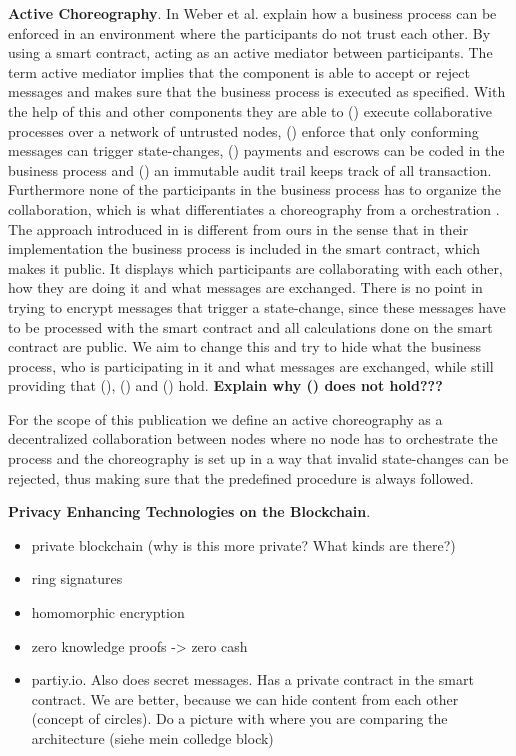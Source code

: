 \documentclass[runningheads]{llncs}
\newcommand{\rom}[1]{(\uppercase\expandafter{\romannumeral #1\relax})}  %
\begin{document}
\bigbreak
\textbf{Active Choreography}. In \cite{weber2016untrusted} Weber et al. explain how a business process can be enforced in an environment where the participants do not trust each other. By using a smart contract, acting as an active mediator between participants. The term active mediator implies that the component is able to accept or reject messages and makes sure that the business process is executed as specified. With the help of this and other components they are able to \rom{1} execute collaborative processes over a network of untrusted nodes, \rom{2} enforce that only conforming messages can trigger state-changes, \rom{3} payments and escrows can be coded in the business process and \rom{4} an immutable audit trail keeps track of all transaction. Furthermore none of the participants in the business process has to organize the collaboration, which is what differentiates a choreography from a orchestration \cite{some_source}. The approach introduced in \cite{weber2016untrusted} is different from ours in the sense that in their implementation the business process is included in the smart contract, which makes it public. It displays which participants are collaborating with each other, how they are doing it and what messages are exchanged. There is no point in trying to encrypt messages that trigger a state-change, since these messages have to be processed with the smart contract and all calculations done on the smart contract are public. We aim to change this and try to hide what the business process, who is participating in it and what messages are exchanged, while still providing that \rom{1}, \rom{2} and \rom{4} hold. \textbf{Explain why \rom{3} does not hold???}

For the scope of this publication we define an active choreography as a decentralized collaboration between nodes where no node has to orchestrate the process and the choreography is set up in a way that invalid state-changes can be rejected, thus making sure that the predefined procedure is always followed. 




\bigbreak
\textbf{Privacy Enhancing Technologies on the Blockchain}.
\begin{itemize}
    \item private blockchain (why is this more private? What kinds are there?)
    \item ring signatures
    \item homomorphic encryption
    \item zero knowledge proofs -> zero cash
    \item partiy.io. Also does secret messages. Has a private contract in the smart contract. We are better, because we can hide content from each other (concept of circles). Do a picture with where you are comparing the architecture (siehe mein colledge block)
\end{itemize}
\end{document}

